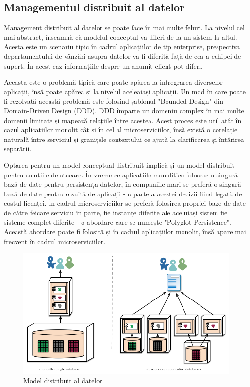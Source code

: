 \documentclass[12pt, a4paper, oneside, romanian]{teza-upb}
\begin{document}
\subsection{Managementul distribuit al datelor}

Management distribuit al datelor se poate face în mai multe feluri. La nivelul cel mai abstract, înseamnă că modelul conceptul va diferi de la un sistem la altul. Acesta este un scenariu tipic în cadrul aplicațiilor de tip enterprise, prespectiva departamentului de vânzări asupra datelor va fi diferită față de cea a echipei de suport. În acest caz informațiile despre un anumit client pot diferi. 

Aceasta este o problemă tipică care poate apărea la intregrarea diverselor aplicații, însă poate apărea și la nivelul aceleaiași aplicații. Un mod în care poate fi rezolvată această problemă este folosind șablonul "Bounded Design" din Domain-Driven Design (DDD). DDD împarte un domeniu complex în mai multe domenii limitate și mapează relațiile între acestea. Acest proces este util atât în cazul aplicațiilor monolit cât și în cel al microserviciilor, însă există o corelație naturală între serviciul și granițele contextului ce ajută la clarificarea și întărirea separării. 

Optarea pentru un model conceptual distribuit implică și un model distribuit pentru soluțiile de stocare. În vreme ce aplicațiile monolitice folosesc o singură bază de date pentru persistența datelor, în companiile mari se preferă o singură bază de date pentru o suită de aplicații - o parte a acestei decizii fiind legată de costul licenței. În cadrul microserviciilor se preferă folosirea propriei baze de date de către feicare serviciu în parte, fie instanțe diferite ale aceluiași sistem fie sisteme complet diferite - o abordare care se numește "Polyglot Persistence". Această abordare poate fi folosită și în cadrul aplicațiilor monolit, însă apare mai frecvent în cadrul microserviciilor. 

\begin{figure}[ht]
\centering
\includegraphics[scale=0.5]{img/decentralised-data.png}
\caption{Model distribuit al datelor}
\label{fig:model_dist_date}
\end{figure}
\end{document}
